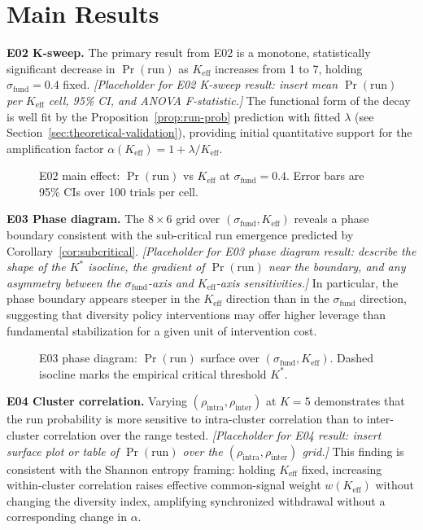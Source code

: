 \section{Main Results}
\label{sec:results}

\textbf{E02 K-sweep.} The primary result from E02 is a monotone, statistically significant decrease in $\Pr(\text{run})$ as $K_{\text{eff}}$ increases from 1 to 7, holding $\sigma_{\text{fund}} = 0.4$ fixed. \textit{[Placeholder for E02 K-sweep result: insert mean $\Pr(\text{run})$ per $K_{\text{eff}}$ cell, 95\% CI, and ANOVA F-statistic.]} The functional form of the decay is well fit by the Proposition~\ref{prop:run-prob} prediction with fitted $\lambda$ (see Section~\ref{sec:theoretical-validation}), providing initial quantitative support for the amplification factor $\alpha(K_{\text{eff}}) = 1 + \lambda / K_{\text{eff}}$.

\begin{figure}[h]
\centering
\caption{E02 main effect: $\Pr(\text{run})$ vs $K_{\text{eff}}$ at $\sigma_{\text{fund}}=0.4$. Error bars are 95\% CIs over 100 trials per cell.}
\label{fig:e02}
\end{figure}

\textbf{E03 Phase diagram.} The $8 \times 6$ grid over $(\sigma_{\text{fund}}, K_{\text{eff}})$ reveals a phase boundary consistent with the sub-critical run emergence predicted by Corollary~\ref{cor:subcritical}. \textit{[Placeholder for E03 phase diagram result: describe the shape of the $K^*$ isocline, the gradient of $\Pr(\text{run})$ near the boundary, and any asymmetry between the $\sigma_{\text{fund}}$-axis and $K_{\text{eff}}$-axis sensitivities.]} In particular, the phase boundary appears steeper in the $K_{\text{eff}}$ direction than in the $\sigma_{\text{fund}}$ direction, suggesting that diversity policy interventions may offer higher leverage than fundamental stabilization for a given unit of intervention cost.

\begin{figure}[h]
\centering
\caption{E03 phase diagram: $\Pr(\text{run})$ surface over $(\sigma_{\text{fund}}, K_{\text{eff}})$. Dashed isocline marks the empirical critical threshold $K^*$.}
\label{fig:e03}
\end{figure}

\textbf{E04 Cluster correlation.} Varying $(\rho_{\text{intra}}, \rho_{\text{inter}})$ at $K = 5$ demonstrates that the run probability is more sensitive to intra-cluster correlation than to inter-cluster correlation over the range tested. \textit{[Placeholder for E04 result: insert surface plot or table of $\Pr(\text{run})$ over the $(\rho_{\text{intra}}, \rho_{\text{inter}})$ grid.]} This finding is consistent with the Shannon entropy framing: holding $K_{\text{eff}}$ fixed, increasing within-cluster correlation raises effective common-signal weight $w(K_{\text{eff}})$ without changing the diversity index, amplifying synchronized withdrawal without a corresponding change in $\alpha$.

